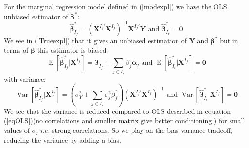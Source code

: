 \documentclass[12pt,a4paper]{report}
\begin{document}
For the marginal regression model defined in (\ref{modexpl})
we have the \textsc{OLS} unbiased estimator of $\boldsymbol{\beta}^*$: 
		\begin{equation}
			\hat{\boldsymbol{\beta}}_{I_f}^* = (\boldsymbol{X}^{I_f'}\boldsymbol{X}^{I_f})^{-1}\boldsymbol{X}^{I_f'}\boldsymbol{Y}  \textrm{ and }\boldsymbol{\hat\beta}_{I_r}^* = \boldsymbol{0}
		\end{equation}
		We see in (\ref{Trueexpl}) that it gives an unbiased estimation of $\boldsymbol{Y}$ and $\boldsymbol{\beta^*}$
		but in terms of $\boldsymbol{\beta}$ this estimator is biased:
		\begin{equation}
			\operatorname{E}[\hat{\boldsymbol{\beta}}_{I_f}^*|\boldsymbol{X}^{I_f}]=\boldsymbol{\beta}_{I_f}+\sum_{j \in I_r}\beta_{j}\boldsymbol{\alpha}_j \textrm{ and }\operatorname{E}[\hat{\boldsymbol{\beta}}_{I_r}^*|\boldsymbol{X}^{I_f}]=\boldsymbol{0}
		\end{equation}
		with variance:
		\begin{equation}
			\operatorname{Var}[\hat{\boldsymbol{\beta}}_{I_f}^*|\boldsymbol{X}^{I_f}]= (\sigma^2_Y+\sum_{j \in I_r}\sigma^2_{j}\beta_{j}^2 )(\boldsymbol{X}^{I_f'} \boldsymbol{X}^{I_f})^{-1}  \textrm{ and }\operatorname{Var}[\hat{\boldsymbol{\beta}}_{I_r}^*|\boldsymbol{X}^{I_f}]= \boldsymbol{0} 
		\end{equation}
		We see that the variance is reduced compared to OLS described in equation (\ref{eqOLS})(no correlations and smaller matrix give better conditioning ) for small values of $\sigma_j$ $i.e.$ strong correlations. So we play on the bias-variance tradeoff, reducing the variance by adding a bias. 				  
		  
\end{document}
